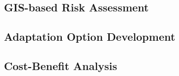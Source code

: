 \subsection{GIS-based Risk Assessment}

\subsection{Adaptation Option Development}

\subsection{Cost-Benefit Analysis}
